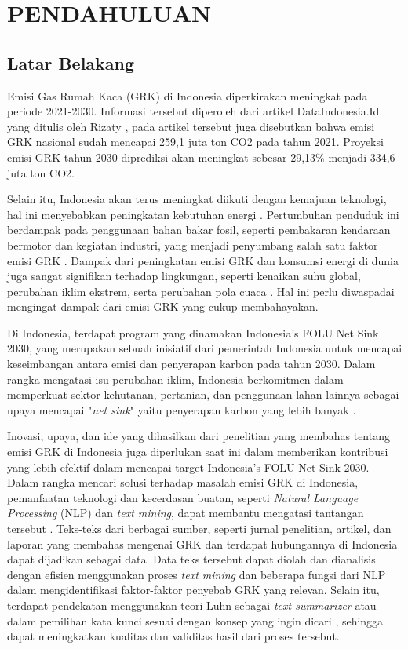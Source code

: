 \chapter{PENDAHULUAN}
\label{BAB1:pendahuluan}

\section{Latar Belakang}
Emisi Gas Rumah Kaca (GRK) di Indonesia diperkirakan meningkat pada periode 2021-2030. Informasi tersebut diperoleh dari artikel DataIndonesia.Id yang ditulis oleh Rizaty \cite{rizaty_emisi_2022}, pada artikel tersebut juga disebutkan bahwa emisi GRK nasional sudah mencapai 259,1 juta ton CO2 pada tahun 2021. Proyeksi emisi GRK tahun 2030 diprediksi akan meningkat sebesar 29,13\% menjadi 334,6 juta ton CO2. 

Selain itu, Indonesia akan terus meningkat diikuti dengan kemajuan teknologi, hal ini menyebabkan peningkatan kebutuhan energi \cite{kristanto_estimating_2019}. Pertumbuhan penduduk ini berdampak pada penggunaan bahan bakar fosil, seperti pembakaran kendaraan bermotor dan kegiatan industri, yang menjadi penyumbang salah satu faktor emisi GRK \citep{ketaren_peranan_2023}. Dampak dari peningkatan emisi GRK dan konsumsi energi di dunia juga sangat signifikan terhadap lingkungan, seperti kenaikan suhu global, perubahan iklim ekstrem, serta perubahan pola cuaca \citep{li_relationship_2023}. Hal ini perlu diwaspadai mengingat dampak dari emisi GRK yang cukup membahayakan.

Di Indonesia, terdapat program yang dinamakan Indonesia's FOLU Net Sink 2030, yang merupakan sebuah inisiatif dari pemerintah Indonesia untuk mencapai keseimbangan antara emisi dan penyerapan karbon pada tahun 2030. Dalam rangka mengatasi isu perubahan iklim, Indonesia berkomitmen dalam memperkuat sektor kehutanan, pertanian, dan penggunaan lahan lainnya sebagai upaya mencapai "\textit{net sink}" yaitu penyerapan karbon yang lebih banyak \cite{lhk_standar_2023}.

Inovasi, upaya, dan ide yang dihasilkan dari penelitian yang membahas tentang emisi GRK di Indonesia  juga diperlukan saat ini dalam memberikan kontribusi yang lebih efektif dalam mencapai target Indonesia's FOLU Net Sink 2030. Dalam rangka mencari solusi terhadap masalah emisi GRK di Indonesia, pemanfaatan teknologi dan kecerdasan buatan, seperti \textit{Natural Language Processing} (NLP) dan \textit{text mining}, dapat membantu mengatasi tantangan tersebut \cite{tiwari2023, Salloum2018}. Teks-teks dari berbagai sumber, seperti jurnal penelitian, artikel, dan laporan yang membahas mengenai GRK dan terdapat hubungannya di Indonesia dapat dijadikan sebagai data. Data teks tersebut dapat diolah dan dianalisis dengan efisien menggunakan proses \textit{text mining} dan beberapa fungsi dari NLP dalam mengidentifikasi faktor-faktor penyebab GRK yang relevan. Selain itu, terdapat pendekatan menggunakan teori Luhn \cite{luhn_automatic_1958} sebagai \textit{text summarizer} \cite{ocr-based_2023} atau dalam pemilihan kata kunci sesuai dengan konsep yang ingin dicari \cite{rahmah_critical_2022}, sehingga dapat meningkatkan kualitas dan validitas hasil dari proses tersebut.

